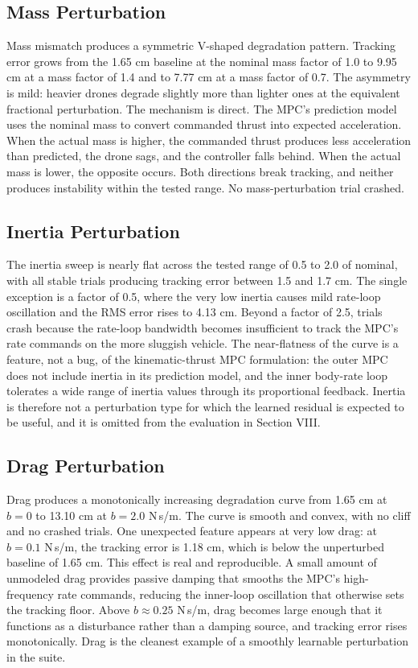 \documentclass[conference]{IEEEtran}
\begin{document}
\subsection{Mass Perturbation}
Mass mismatch produces a symmetric V-shaped degradation pattern. Tracking error grows from the 1.65 cm baseline at the nominal mass factor of 1.0 to 9.95 cm at a mass factor of 1.4 and to 7.77 cm at a mass factor of 0.7. The asymmetry is mild: heavier drones degrade slightly more than lighter ones at the equivalent fractional perturbation. The mechanism is direct. The MPC's prediction model uses the nominal mass to convert commanded thrust into expected acceleration. When the actual mass is higher, the commanded thrust produces less acceleration than predicted, the drone sags, and the controller falls behind. When the actual mass is lower, the opposite occurs. Both directions break tracking, and neither produces instability within the tested range. No mass-perturbation trial crashed.

\subsection{Inertia Perturbation}
The inertia sweep is nearly flat across the tested range of 0.5 to 2.0 of nominal, with all stable trials producing tracking error between 1.5 and 1.7 cm. The single exception is a factor of 0.5, where the very low inertia causes mild rate-loop oscillation and the RMS error rises to 4.13 cm. Beyond a factor of 2.5, trials crash because the rate-loop bandwidth becomes insufficient to track the MPC's rate commands on the more sluggish vehicle. The near-flatness of the curve is a feature, not a bug, of the kinematic-thrust MPC formulation: the outer MPC does not include inertia in its prediction model, and the inner body-rate loop tolerates a wide range of inertia values through its proportional feedback. Inertia is therefore not a perturbation type for which the learned residual is expected to be useful, and it is omitted from the evaluation in Section VIII.

\subsection{Drag Perturbation}
Drag produces a monotonically increasing degradation curve from 1.65 cm at $b = 0$ to 13.10 cm at $b = 2.0$ N\,s/m. The curve is smooth and convex, with no cliff and no crashed trials. One unexpected feature appears at very low drag: at $b = 0.1$ N\,s/m, the tracking error is 1.18 cm, which is below the unperturbed baseline of 1.65 cm. This effect is real and reproducible. A small amount of unmodeled drag provides passive damping that smooths the MPC's high-frequency rate commands, reducing the inner-loop oscillation that otherwise sets the tracking floor. Above $b \approx 0.25$ N\,s/m, drag becomes large enough that it functions as a disturbance rather than a damping source, and tracking error rises monotonically. Drag is the cleanest example of a smoothly learnable perturbation in the suite.
\end{document}
